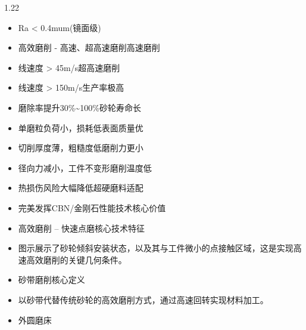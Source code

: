 \documentclass[12pt,a4paper]{article}
\begin{document}
\begin{spacing}{1.22}
\begin{itemize}[leftmargin=2.2em,label=--]
  \item Ra < 0.4mum(镜面级)
  \item 高效磨削 - 高速、超高速磨削高速磨削
  \item 线速度 > 45m/s超高速磨削
  \item 线速度 > 150m/s生产率极高
  \item 磨除率提升30\%\textasciitilde{}100\%砂轮寿命长
  \item 单磨粒负荷小，损耗低表面质量优
  \item 切削厚度薄，粗糙度低磨削力更小
  \item 径向力减小，工件不变形磨削温度低
  \item 热损伤风险大幅降低超硬磨料适配
  \item 完美发挥CBN/金刚石性能技术核心价值
  \item 高效磨削 – 快速点磨核心技术特征
  \item 图示展示了砂轮倾斜安装状态，以及其与工件微小的点接触区域，这是实现高速高效磨削的关键几何条件。
  \item 砂带磨削核心定义
  \item 以砂带代替传统砂轮的高效磨削方式，通过高速回转实现材料加工。
  \item 外圆磨床
\end{itemize}


\end{spacing}
\end{document}
